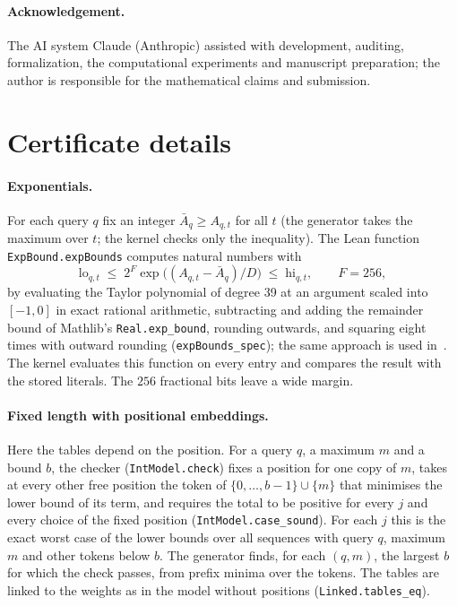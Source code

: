 \documentclass[11pt,a4paper]{article}
\newcommand{\lean}[1]{\texttt{#1}}
\begin{document}
\paragraph{Acknowledgement.}
The AI system Claude (Anthropic) assisted with development, auditing,
formalization, the computational experiments and manuscript preparation; the
author is responsible for the mathematical claims and submission.




\appendix

\section{Certificate details}\label{app:cert}

\paragraph{Exponentials.}
For each query $q$ fix an integer $\bar A_q\ge A_{q,t}$ for all $t$ (the
generator takes the maximum over $t$; the kernel checks only the inequality).
The Lean function \lean{ExpBound.expBounds} computes natural numbers with
\[
 \mathrm{lo}_{q,t}\;\le\;2^{F}\exp\bigl((A_{q,t}-\bar A_q)/D\bigr)\;\le\;\mathrm{hi}_{q,t},\qquad F=256,
\]
by evaluating the Taylor polynomial of degree 39 at an argument scaled into
$[-1,0]$ in exact rational arithmetic, subtracting and adding the remainder
bound of Mathlib's \lean{Real.exp\_bound}, rounding outwards, and squaring eight
times with outward rounding (\lean{expBounds\_spec}); the same approach is used
in~\cite{tealsea2026}. The kernel evaluates this function on every entry and
compares the result with the stored literals. The $256$ fractional bits leave a
wide margin.

\paragraph{Fixed length with positional embeddings.}
Here the tables depend on the position. For a query $q$, a maximum $m$ and a
bound $b$, the checker (\lean{IntModel.check}) fixes a position for one copy of
$m$, takes at every other free position the token of $\{0,\dots,b-1\}\cup\{m\}$
that minimises the lower bound of its term, and requires the total to be
positive for every $j$ and every choice of the fixed position
(\lean{IntModel.case\_sound}). For each $j$ this is the exact worst case of the
lower bounds over all sequences with query $q$, maximum $m$ and other tokens
below $b$. The generator finds, for each $(q,m)$, the largest $b$ for which the
check passes, from prefix minima over the tokens. The tables are linked to the
weights as in the model without positions (\lean{Linked.tables\_eq}).
\end{document}
